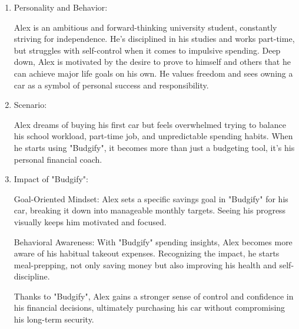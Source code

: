 \documentclass[a4paper,12pt]{article}
\begin{document}
\begin{enumerate}
    \item Personality and Behavior:
    
    Alex is an ambitious and forward-thinking university student, constantly striving for independence. He's disciplined in his studies and works part-time, but struggles with self-control when it comes to impulsive spending. Deep down, Alex is motivated by the desire to prove to himself and others that he can achieve major life goals on his own. He values freedom and sees owning a car as a symbol of personal success and responsibility.
    
    \item Scenario:
    
    Alex dreams of buying his first car but feels overwhelmed trying to balance his school workload, part-time job, and unpredictable spending habits. When he starts using "Budgify", it becomes more than just a budgeting tool, it’s his personal financial coach.
    
    \item Impact of "Budgify":
    
    Goal-Oriented Mindset: Alex sets a specific savings goal in "Budgify" for his car, breaking it down into manageable monthly targets. Seeing his progress visually keeps him motivated and focused.
    
    Behavioral Awareness: With "Budgify" spending insights, Alex becomes more aware of his habitual takeout expenses. Recognizing the impact, he starts meal-prepping, not only saving money but also improving his health and self-discipline.
    
    Thanks to "Budgify", Alex gains a stronger sense of control and confidence in his financial decisions, ultimately purchasing his car without compromising his long-term security.

\end{enumerate}
\end{document}

